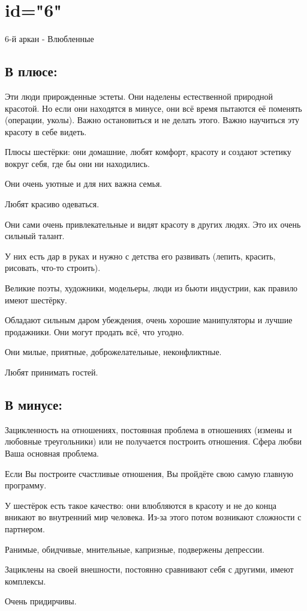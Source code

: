 \endsection

\section{id="6"}{6-й аркан - Влюбленные}

\subsection{В плюсе:}
\item Эти люди прирожденные эстеты. Они наделены естественной природной красотой. Но если они находятся в минусе, они всё время пытаются её поменять (операции, уколы). Важно остановиться и не делать этого. Важно научиться эту красоту в себе видеть.
\item Плюсы шестёрки: они домашние, любят комфорт, красоту и создают эстетику вокруг себя, где бы они ни находились.
\item Они очень уютные и для них важна семья.
\item Любят красиво одеваться.
\item Они сами очень привлекательные и видят красоту в других людях. Это их очень сильный талант.
\item У них есть дар в руках и нужно с детства его развивать (лепить, красить, рисовать, что-то строить).
\item Великие поэты, художники, модельеры, люди из бьюти индустрии, как правило имеют шестёрку.
\item Обладают сильным даром убеждения, очень хорошие манипуляторы и лучшие продажники. Они могут продать всё, что угодно.
\item Они милые, приятные, доброжелательные, неконфликтные.
\item Любят принимать гостей.
\endsubsection

\subsection{В минусе:}
\item Зацикленность на отношениях, постоянная проблема в отношениях (измены и любовные треугольники) или не получается построить отношения. Сфера любви Ваша основная проблема.
\item Если Вы построите счастливые отношения, Вы пройдёте свою самую главную программу.
\item У шестёрок есть такое качество: они влюбляются в красоту и не до конца вникают во внутренний мир человека. Из-за этого потом возникают сложности с партнером.
\item Ранимые, обидчивые, мнительные, капризные, подвержены депрессии.
\item Зациклены на своей внешности, постоянно сравнивают себя с другими, имеют комплексы.
\item Очень придирчивы.
\endsubsection

